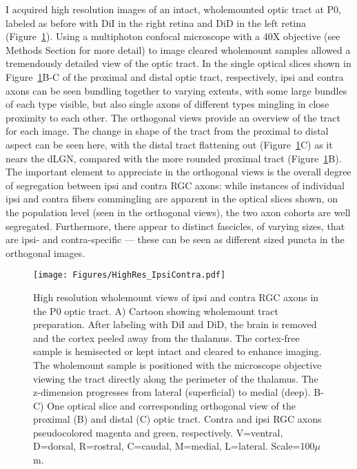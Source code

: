I acquired high resolution images of an intact, wholemounted optic tract at P0, labeled as before with DiI in the right retina and DiD in the left retina (Figure~\ref{Figures/HighResIpsiContra}).
Using a multiphoton confocal microscope with a 40X objective (see Methods Section for more detail) to image cleared wholemount samples allowed a tremendously detailed view of the optic tract.
In the single optical slices shown in Figure~\ref{Figures/HighResIpsiContra}B-C of the proximal and distal optic tract, respectively, ipsi and contra axons can be seen bundling together to varying extents, with some large bundles of each type visible, but also single axons of different types mingling in close proximity to each other.
The orthogonal views provide an overview of the tract for each image.
The change in shape of the tract from the proximal to distal aspect can be seen here, with the distal tract flattening out (Figure~\ref{Figures/HighResIpsiContra}C) as it nears the dLGN, compared with the more rounded proximal tract (Figure~\ref{Figures/HighResIpsiContra}B).
The important element to appreciate in the orthogonal views is the overall degree of segregation between ipsi and contra RGC axons: while instances of individual ipsi and contra fibers commingling are apparent in the optical slices shown, on the population level (seen in the orthogonal views), the two axon cohorts are well segregated.
Furthermore, there appear to distinct fascicles, of varying sizes, that are ipsi- and contra-specific --- these can be seen as different sized puncta in the orthogonal images.
\begin{figure}[hbtp]
    \begin{center}
        \texttt{[image: Figures/HighRes\_IpsiContra.pdf]}
        \caption[High resolution wholemount views of ipsi and contra RGC axons in the P0 optic tract.]
        {High resolution wholemount views of ipsi and contra RGC axons in the P0 optic tract.
        A) Cartoon showing wholemount tract preparation.
        After labeling with DiI and DiD, the brain is removed and the cortex peeled away from the thalamus.
        The cortex-free sample is hemisected or kept intact and cleared to enhance imaging.
        The wholemount sample is positioned with the microscope objective viewing the tract directly along the perimeter of the thalamus.
        The z-dimension progresses from lateral (superficial) to medial (deep).
        B-C) One optical slice and corresponding orthogonal view of the proximal (B) and distal (C) optic tract.
        Contra and ipsi RGC axons pseudocolored magenta and green, respectively.
        V=ventral, D=dorsal, R=rostral, C=caudal, M=medial, L=lateral.
        Scale=100$\mu$m.
        }
        \label{Figures/HighResIpsiContra}
    \end{center}
\end{figure}

